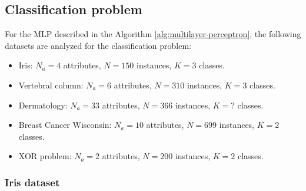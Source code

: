\documentclass[12pt,a4paper]{article}
\begin{document}
\subsection{Classification problem}

For the MLP described in the Algorithm \ref{alg:multilayer-perceptron}, the following datasets are analyzed for the classification problem:
\begin{itemize}
    \item Iris: \(N_a = 4\) attributes, \(N = 150\) instances, \(K =3\) classes.
    \item Vertebral column: \(N_a = 6\) attributes, \(N = 310\) instances, \(K =3\) classes.
    \item Dermatology: \(N_a = 33\) attributes, \(N = 366\) instances, \(K = ?\) classes.
    \item Breast Cancer Wisconsin: \(N_a = 10\) attributes, \(N = 699\) instances, \(K = 2\) classes.
    \item XOR problem: \(N_a = 2\) attributes, \(N = 200\) instances, \(K = 2\) classes.
\end{itemize}

\subsubsection{Iris dataset}
\end{document}
